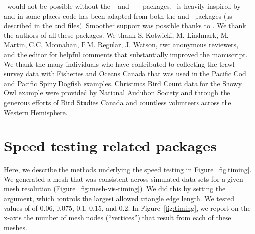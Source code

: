 \documentclass[article]{jss}\usepackage[]{graphicx}\usepackage[dvipsnames]{xcolor}
\newcommand{\sdmTMB}{\pkg{sdmTMB}}
\newcommand{\INLA}{\proglang{R}-\pkg{INLA}}
\newcommand{\TMB}{\pkg{TMB}}
\newcommand{\R}{\proglang{R}}
\begin{document}
\sdmTMB\ would not be possible without the \TMB\ \citep{kristensen2016} and \INLA\ \citep{rue2009, lindgren2011, lindgren2015} \R\ packages.
\sdmTMB\ is heavily inspired by and in some places code has been adapted from both the  \citep{thorson2019} and  \citep{brooks2017} \R\ packages (as described in the  and  files).
Smoother support was possible thanks to  \citep{wood2017a}.
We thank the authors of all these packages.
We thank S. Kotwicki, M. Lindmark, M. Martin, C.C. Monnahan, P.M. Regular, J. Watson, two anonymous reviewers, and the editor for helpful comments that substantially improved the manuscript.
We thank the many individuals who have contributed to collecting the trawl survey data with Fisheries and Oceans Canada that was used in the Pacific Cod and Pacific Spiny Dogfish examples.
Christmas Bird Count data for the Snowy Owl example were provided by National Audubon Society and through the generous efforts of Bird Studies Canada and countless volunteers across the Western Hemisphere.







\newpage

\clearpage

\appendix

\section{Speed testing related packages}\label{app:speed}
Here, we describe the methods underlying the speed testing in Figure~\ref{fig:timing}.
We generated a mesh that was consistent across simulated data sets for a given mesh resolution (Figure~\ref{fig:mesh-vis-timing}).
We did this by setting the  argument, which controls the largest allowed triangle edge length.
We tested values of  of 0.06, 0.075, 0.1, 0.15, and 0.2.
In Figure~\ref{fig:timing}, we report on the x-axis the number of mesh nodes (``vertices'') that result from each of these meshes.
\end{document}
